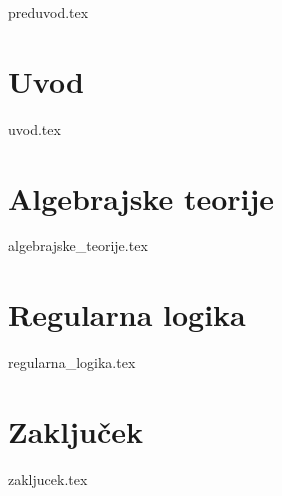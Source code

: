 \documentclass[12pt,a4paper]{book}
\begin{document}
%
\frontmatter
{preduvod.tex}
%
\mainmatter
\setcounter{page}{1}
\pagestyle{fancy}
%
\chapter{Uvod}
{uvod.tex}
%
\chapter{Algebrajske teorije}
{algebrajske_teorije.tex}
%
\chapter{Regularna logika}
{regularna_logika.tex}
%
\chapter{Zaključek}
{zakljucek.tex}
%
\end{document}
